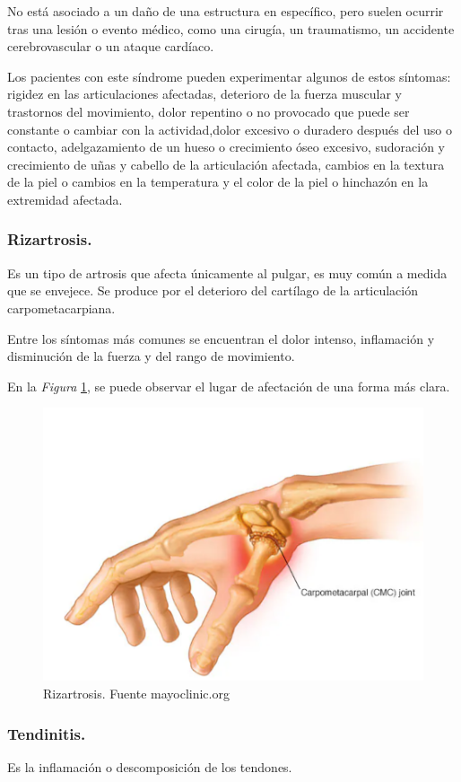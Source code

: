 No está asociado a un daño de una estructura en específico, pero suelen ocurrir tras una lesión o evento médico, como una cirugía, un traumatismo, un accidente cerebrovascular o un ataque cardíaco. \cite{sindrome_regional_comple}

Los pacientes con este síndrome pueden experimentar algunos de estos síntomas: rigidez en las articulaciones afectadas, deterioro de la fuerza muscular y trastornos del movimiento, dolor repentino o no provocado que puede ser constante o cambiar con la actividad,dolor excesivo o duradero después del uso o contacto, adelgazamiento de un hueso o crecimiento óseo excesivo, sudoración y crecimiento de uñas y cabello de la articulación afectada, cambios en la textura de la piel o cambios en la temperatura y el color de la piel o hinchazón en la extremidad afectada. \cite{sindrome_regional_comple}

\subsubsection{Rizartrosis.}
Es un tipo de artrosis que afecta únicamente al pulgar, es muy común a medida que se envejece. Se produce por el deterioro del cartílago de la articulación carpometacarpiana.

Entre los síntomas más comunes se encuentran el dolor intenso, inflamación y disminución de la fuerza y del rango de movimiento.\cite{artritis_pulgar}

En la \textit{Figura} \ref{fig: Rizartrosis}, se puede observar el lugar de afectación de una forma más clara.

\begin{figure}
    \centering
    \includegraphics[width=0.5\linewidth]{img/Rizartrosis.png}
    \caption{Rizartrosis. Fuente mayoclinic.org}
    \label{fig: Rizartrosis}
\end{figure}
\subsubsection{Tendinitis.}
Es la inflamación o descomposición de los tendones.\cite{tendinitis-1}

